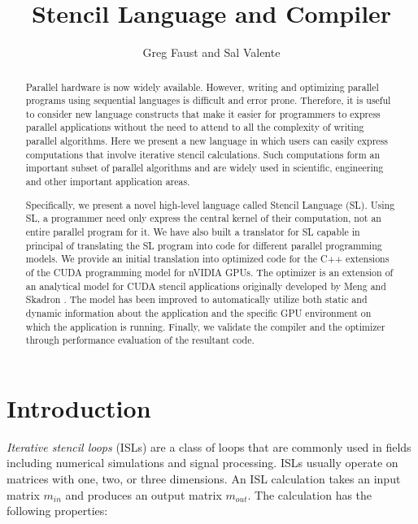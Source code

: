 \documentclass{styles/sig-alternate}
\begin{document}
\title{Stencil Language and Compiler}
\author{
\alignauthor Greg Faust and Sal Valente\\
}
\maketitle

\begin{abstract}

Parallel hardware is now widely available.  However, writing and optimizing parallel 
programs using sequential languages is difficult and error prone.  
Therefore, it is useful to consider 
new language constructs that make it easier for programmers to express parallel applications
without the need to attend to all the complexity of writing parallel algorithms.  
Here we present a new language in which users can easily 
express computations that involve iterative stencil calculations.  
Such computations form an important subset of parallel algorithms and are 
widely used in scientific, engineering and other important application areas.


Specifically, we present a novel high-level language called Stencil Language (SL).
Using SL, a programmer need only express the central kernel of their 
computation, not an entire parallel program for it.  We have also built a 
translator for SL capable in principal of translating the SL program into code for 
different parallel programming models.  We provide an initial translation into optimized 
code for the C++ extensions of the CUDA programming model for nVIDIA GPUs.  
The optimizer is an extension of an analytical 
model for CUDA stencil applications originally developed by Meng and Skadron \cite{meng}.
The model has been improved to automatically utilize both static and dynamic information 
about the application and the specific GPU environment on which the application is running.
Finally, we validate the compiler and the optimizer through performance evaluation of the resultant code.

\end{abstract}

\section{Introduction}

{\em Iterative stencil loops} (ISLs) \cite{li} are a class of loops
that are commonly used in fields including numerical simulations and
signal processing.  ISLs usually operate on matrices with one, two, or
three dimensions.  An ISL calculation takes an input matrix $m_{in}$
and produces an output matrix $m_{out}$.  The calculation has the
following properties:
\end{document}
